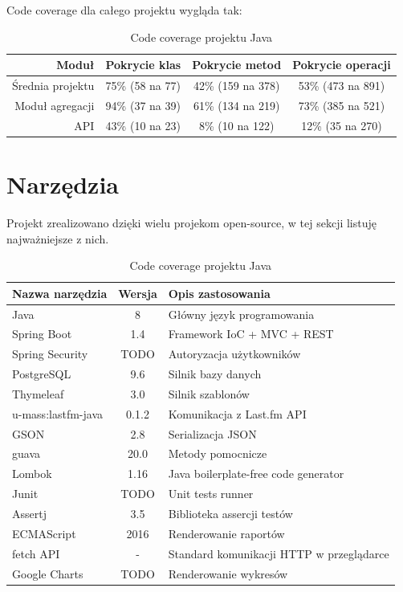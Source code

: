 \documentclass[openright]{xmgr}
\begin{document}
Code coverage dla całego projektu wygląda tak:
\begin{table}

	\begin{tabular}{|r|c|c|c|}
		\hline
		Moduł & Pokrycie klas & Pokrycie metod & Pokrycie operacji \\ \hline
		Średnia projektu & 75\% (58 na 77) & 42\% (159 na 378) & 53\% (473 na 891) \\
		Moduł agregacji & 94\% (37 na 39) & 61\% (134 na 219) & 73\% (385 na 521) \\
		API & 43\% (10 na 23) & 8\% (10 na 122) & 12\% (35 na 270) \\  \hline
	\end{tabular}

    \caption{
	Code coverage projektu Java
	}
\label{Projekt --- Code coverage}
\end{table}

\section{Narzędzia}

    Projekt zrealizowano dzięki wielu projekom open-source, w tej sekcji listuję najważniejsze z nich.

\begin{table}
\begin{tabular}{|l|c|l|}
	\hline
	Nazwa narzędzia & Wersja & Opis zastosowania \\
	\hline
	Java & 8 & Główny język programowania \\
	\hline
	Spring Boot & 1.4 & Framework IoC + MVC + REST \\
    \hline
	Spring Security & TODO & Autoryzacja użytkowników \\
	\hline
	PostgreSQL & 9.6 & Silnik bazy danych \\
	\hline
	Thymeleaf & 3.0 & Silnik szablonów \\
	\hline
	u-mass:lastfm-java & 0.1.2 & Komunikacja z Last.fm API \\
	\hline
	GSON & 2.8 & Serializacja JSON \\
	\hline
	guava & 20.0 & Metody pomocnicze \\
	\hline
	Lombok & 1.16 & Java boilerplate-free code generator \\
	\hline
	Junit & TODO & Unit tests runner \\
	\hline
	Assertj & 3.5 & Biblioteka assercji testów \\
	\hline
    ECMAScript & 2016 & Renderowanie raportów \\
    \hline
    fetch API & - & Standard komunikacji HTTP w przeglądarce \\
    \hline
    Google Charts & TODO & Renderowanie wykresów \\
    \hline
\end{tabular}
    \caption{Code coverage projektu Java}
	\label{Projekt - Code coverage}
\end{table}





\listoftables

\listoffigures

\oswiadczenie
\end{document}

